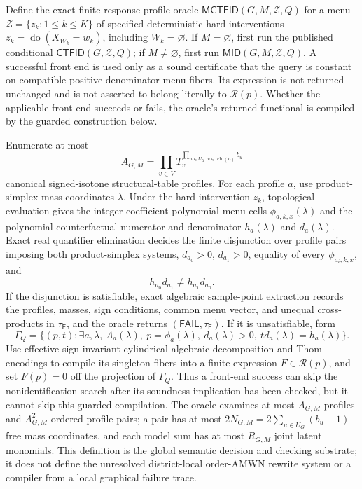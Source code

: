 Define the exact finite response-profile oracle \(\mathsf{MCTFID}(G,M,\mathcal Z,Q)\) for a menu \(\mathcal Z=\{z_k:1\le k\le K\}\) of specified deterministic hard interventions \(z_k=\operatorname{do}(X_{W_k}=w_k)\), including \(W_k=\varnothing\).  If \(M=\varnothing\), first run the published conditional \(\mathsf{CTFID}(G,\mathcal Z,Q)\); if \(M\ne\varnothing\), first run \(\mathsf{MID}(G,M,\mathcal Z,Q)\).  A successful front end is used only as a sound certificate that the query is constant on compatible positive-denominator menu fibers.  Its expression is not returned unchanged and is not asserted to belong literally to \(\mathcal R(p)\).  Whether the applicable front end succeeds or fails, the oracle's returned functional is compiled by the guarded construction below.

Enumerate at most
\[
 A_{G,M}=\prod_{v\in V}T_v^{\prod_{u\in U_G:\,v\in\operatorname{ch}(u)}b_u}
\]
canonical signed-isotone structural-table profiles.  For each profile \(a\), use product-simplex mass coordinates \(\lambda\).  Under the hard intervention \(z_k\), topological evaluation gives the integer-coefficient polynomial menu cells \(\phi_{a,k,x}(\lambda)\) and the polynomial counterfactual numerator and denominator \(h_a(\lambda)\) and \(d_a(\lambda)\).  Exact real quantifier elimination decides the finite disjunction over profile pairs imposing both product-simplex systems, \(d_{a_0}>0\), \(d_{a_1}>0\), equality of every \(\phi_{a_i,k,x}\), and
\[
 h_{a_0}d_{a_1}\ne h_{a_1}d_{a_0}.
\]
If the disjunction is satisfiable, exact algebraic sample-point extraction records the profiles, masses, sign conditions, common menu vector, and unequal cross-products in \(\tau_{\mathsf F}\), and the oracle returns \((\mathsf{FAIL},\tau_{\mathsf F})\).  If it is unsatisfiable, form
\[
 \Gamma_Q=\{(p,t):\exists a,\lambda,\ \Lambda_a(\lambda),\ p=\phi_a(\lambda),\ d_a(\lambda)>0,\ t d_a(\lambda)=h_a(\lambda)\}.
\]
Use effective sign-invariant cylindrical algebraic decomposition and Thom encodings to compile its singleton fibers into a finite expression \(F\in\mathcal R(p)\), and set \(F(p)=0\) off the projection of \(\Gamma_Q\).  Thus a front-end success can skip the nonidentification search after its soundness implication has been checked, but it cannot skip this guarded compilation.  The oracle examines at most \(A_{G,M}\) profiles and \(A_{G,M}^2\) ordered profile pairs; a pair has at most \(2N_{G,M}=2\sum_{u\in U_G}(b_u-1)\) free mass coordinates, and each model sum has at most \(R_{G,M}\) joint latent monomials.  This definition is the global semantic decision and checking substrate; it does not define the unresolved district-local order-AMWN rewrite system or a compiler from a local graphical failure trace.